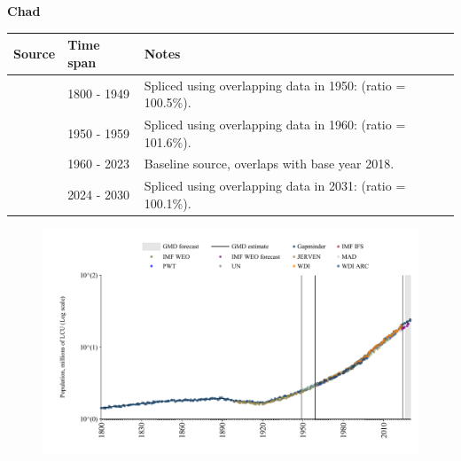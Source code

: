 \documentclass[12pt,a4paper,landscape]{article}
\begin{document}
\begin{adjustbox}{max totalsize={\paperwidth}{\paperheight},center}
\begin{minipage}[t][\textheight][t]{\textwidth}
\vspace*{0.5cm}
{}
\begin{center}
{\Large\bfseries Chad}
\end{center}
\vspace{0.5cm}
\begin{table}[H]
\centering
\small
\begin{tabular}{|l|l|l|}
\hline
\textbf{Source} & \textbf{Time span} & \textbf{Notes} \\
\hline
\rowcolor{white}\cite{Gapminder}& 1800 - 1949 &Spliced using overlapping data in 1950: (ratio = 100.5\%).\\
\rowcolor{lightgray}\cite{IMF_IFS}& 1950 - 1959 &Spliced using overlapping data in 1960: (ratio = 101.6\%).\\
\rowcolor{white}\cite{WDI}& 1960 - 2023 &Baseline source, overlaps with base year 2018.\\
\rowcolor{lightgray}\cite{Gapminder}& 2024 - 2030 &Spliced using overlapping data in 2031: (ratio = 100.1\%).\\
\hline
\end{tabular}
\end{table}
\begin{figure}[H]
\centering
\includegraphics[width=\textwidth,height=0.6\textheight,keepaspectratio]{graphs/TCD_pop.pdf}
\end{figure}
\end{minipage}
\end{adjustbox}
\end{document}
